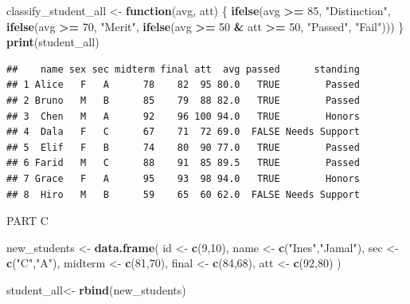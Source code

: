 \documentclass[
]{article}
\newenvironment{Shaded}{\begin{snugshade}}{\end{snugshade}}
\newcommand{\ControlFlowTok}[1]{\textcolor[rgb]{0.13,0.29,0.53}{\textbf{#1}}}
\newcommand{\DecValTok}[1]{\textcolor[rgb]{0.00,0.00,0.81}{#1}}
\newcommand{\FunctionTok}[1]{\textcolor[rgb]{0.13,0.29,0.53}{\textbf{#1}}}
\newcommand{\NormalTok}[1]{#1}
\newcommand{\OtherTok}[1]{\textcolor[rgb]{0.56,0.35,0.01}{#1}}
\newcommand{\SpecialCharTok}[1]{\textcolor[rgb]{0.81,0.36,0.00}{\textbf{#1}}}
\newcommand{\StringTok}[1]{\textcolor[rgb]{0.31,0.60,0.02}{#1}}
\begin{document}
\begin{Shaded}
\begin{Highlighting}[]
\NormalTok{classify\_student\_all }\OtherTok{\textless{}{-}} \ControlFlowTok{function}\NormalTok{(avg, att) \{}
  \FunctionTok{ifelse}\NormalTok{(avg }\SpecialCharTok{\textgreater{}=} \DecValTok{85}\NormalTok{, }\StringTok{"Distinction"}\NormalTok{,}
    \FunctionTok{ifelse}\NormalTok{(avg }\SpecialCharTok{\textgreater{}=} \DecValTok{70}\NormalTok{, }\StringTok{"Merit"}\NormalTok{,}
      \FunctionTok{ifelse}\NormalTok{(avg }\SpecialCharTok{\textgreater{}=} \DecValTok{50} \SpecialCharTok{\&}\NormalTok{ att }\SpecialCharTok{\textgreater{}=} \DecValTok{50}\NormalTok{, }\StringTok{"Passed"}\NormalTok{, }\StringTok{"Fail"}\NormalTok{)))}
\NormalTok{\}}
\FunctionTok{print}\NormalTok{(student\_all)}
\end{Highlighting}
\end{Shaded}

\begin{verbatim}
##    name sex sec midterm final att  avg passed      standing
## 1 Alice   F   A      78    82  95 80.0   TRUE        Passed
## 2 Bruno   M   B      85    79  88 82.0   TRUE        Passed
## 3  Chen   M   A      92    96 100 94.0   TRUE        Honors
## 4  Dala   F   C      67    71  72 69.0  FALSE Needs Support
## 5  Elif   F   B      74    80  90 77.0   TRUE        Passed
## 6 Farid   M   C      88    91  85 89.5   TRUE        Passed
## 7 Grace   F   A      95    93  98 94.0   TRUE        Honors
## 8  Hiro   M   B      59    65  60 62.0  FALSE Needs Support
\end{verbatim}

PART C

\begin{Shaded}
\begin{Highlighting}[]
\NormalTok{new\_students }\OtherTok{\textless{}{-}} \FunctionTok{data.frame}\NormalTok{(}
\NormalTok{id }\OtherTok{\textless{}{-}} \FunctionTok{c}\NormalTok{(}\DecValTok{9}\NormalTok{,}\DecValTok{10}\NormalTok{),}
\NormalTok{name }\OtherTok{\textless{}{-}} \FunctionTok{c}\NormalTok{(}\StringTok{"Ines"}\NormalTok{,}\StringTok{"Jamal"}\NormalTok{),}
\NormalTok{sec }\OtherTok{\textless{}{-}} \FunctionTok{c}\NormalTok{(}\StringTok{"C"}\NormalTok{,}\StringTok{"A"}\NormalTok{),}
\NormalTok{midterm }\OtherTok{\textless{}{-}} \FunctionTok{c}\NormalTok{(}\DecValTok{81}\NormalTok{,}\DecValTok{70}\NormalTok{),}
\NormalTok{final }\OtherTok{\textless{}{-}} \FunctionTok{c}\NormalTok{(}\DecValTok{84}\NormalTok{,}\DecValTok{68}\NormalTok{),}
\NormalTok{att }\OtherTok{\textless{}{-}} \FunctionTok{c}\NormalTok{(}\DecValTok{92}\NormalTok{,}\DecValTok{80}\NormalTok{)}
\NormalTok{)}

\NormalTok{student\_all}\OtherTok{\textless{}{-}} \FunctionTok{rbind}\NormalTok{(new\_students)}
\end{Highlighting}
\end{Shaded}
\end{document}

